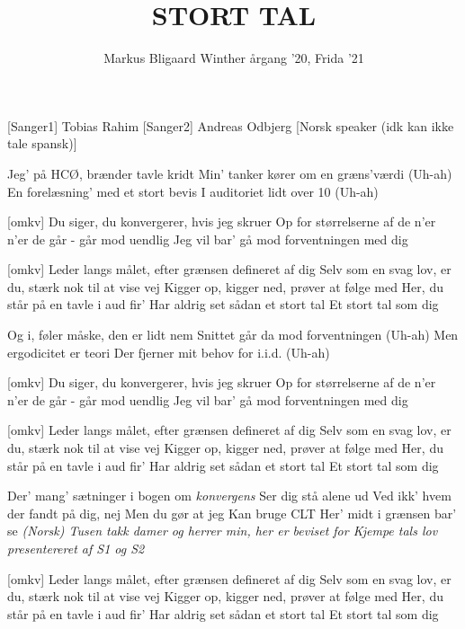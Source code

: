 \documentclass[a4paper,11pt]{article}
\title{STORT TAL}
\author{Markus Bligaard Winther årgang '20, Frida '21}
\begin{document}
\maketitle

\begin{roles}
[Sanger1] Tobias Rahim
[Sanger2] Andreas Odbjerg
[Norsk speaker (idk kan ikke tale spansk)] 
\end{roles}

\begin{song}
   Jeg' på HCØ, brænder tavle kridt
Min' tanker kører om en græns'værdi (Uh-ah)
En forelæsning' med et stort bevis 
I auditoriet lidt over 10 (Uh-ah)

[omkv] Du siger, du konvergerer, hvis jeg skruer
Op for størrelserne af de n'er
n'er de går - går mod uendlig
Jeg vil bar' gå mod forventningen med dig


  [omkv] Leder langs målet, efter grænsen defineret af dig
Selv som en svag lov, er du, stærk nok til at vise vej
Kigger op, kigger ned, prøver at følge med
Her, du står på en tavle i aud fir'
Har aldrig set sådan et stort tal
Et stort tal som dig

   Og i, føler måske, den er lidt nem
Snittet går da mod forventningen (Uh-ah)
Men ergodicitet er teori
Der fjerner mit behov for i.i.d. (Uh-ah)



[omkv] Du siger, du konvergerer, hvis jeg skruer
Op for størrelserne af de n'er
n'er de går - går mod uendlig
Jeg vil bar' gå mod forventningen med dig


  [omkv] Leder langs målet, efter grænsen defineret af dig
Selv som en svag lov, er du, stærk nok til at vise vej
Kigger op, kigger ned, prøver at følge med
Her, du står på en tavle i aud fir'
Har aldrig set sådan et stort tal
Et stort tal som dig

   Der' mang' sætninger i bogen om \textit{konvergens}
Ser dig stå alene ud
Ved ikk' hvem der fandt på dig, nej
Men du gør at jeg
Kan bruge CLT
Her' midt i grænsen bar' se
   \textit{(Norsk) Tusen takk damer og herrer min, her er beviset for Kjempe tals lov presentereret af S1 og S2}


  [omkv] Leder langs målet, efter grænsen defineret af dig
Selv som en svag lov, er du, stærk nok til at vise vej
Kigger op, kigger ned, prøver at følge med
Her, du står på en tavle i aud fir'
Har aldrig set sådan et stort tal
Et stort tal som dig


\end{song}
\end{document}
